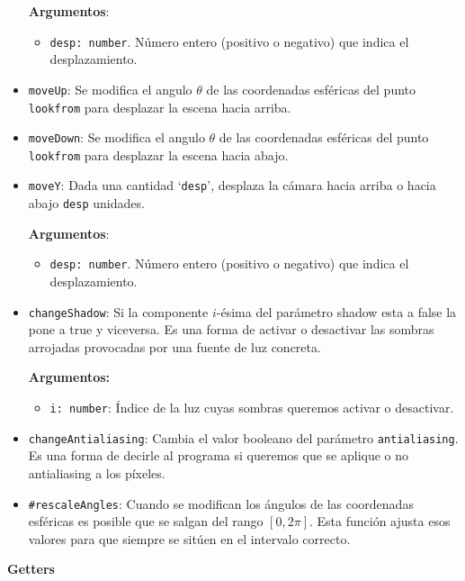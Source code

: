 \begin{itemize}
    \textbf{Argumentos}:
    \begin{itemize}
        \item \verb|desp: number|. Número entero (positivo o negativo) que indica el desplazamiento.
    \end{itemize}
    \item \verb|moveUp|: Se modifica el angulo $\theta$ de las coordenadas esféricas del punto \verb|lookfrom| para desplazar la escena hacia arriba.
    \item \verb|moveDown|: Se modifica el angulo $\theta$ de las coordenadas esféricas del punto \verb|lookfrom| para desplazar la escena hacia abajo.
    \item \verb|moveY|: Dada una cantidad `\verb|desp|', desplaza la cámara hacia arriba o hacia abajo \verb|desp| unidades.

    \textbf{Argumentos}:
    \begin{itemize}
        \item \verb|desp: number|. Número entero (positivo o negativo) que indica el desplazamiento.
    \end{itemize}
    \item \verb|changeShadow|: Si la componente $i$-ésima del parámetro shadow esta a false la pone a true y viceversa. Es una forma de activar o desactivar las sombras arrojadas provocadas por una fuente de luz concreta.
    
    \textbf{Argumentos:}
    \begin{itemize}
        \item \verb|i: number|: Índice de la luz cuyas sombras queremos activar o desactivar.
    \end{itemize}
    \item \verb|changeAntialiasing|: Cambia el valor booleano del parámetro \verb|antialiasing|. Es una forma de decirle al programa si queremos que se aplique o no antialiasing a los píxeles.
    \item \verb|#rescaleAngles|: Cuando se modifican los ángulos de las coordenadas esféricas es posible que se salgan del rango $[0, 2\pi]$. Esta función ajusta esos valores para que siempre se sitúen en el intervalo correcto.
\end{itemize}
\textbf{Getters}
